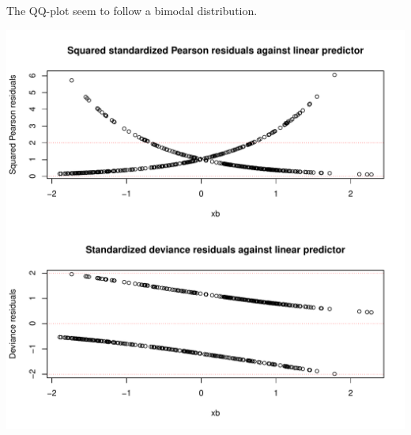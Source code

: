 \documentclass[a4paper]{article}
\begin{document}
The QQ-plot seem to follow a bimodal distribution.

\includegraphics{Project_2_files/figure-latex/unnamed-chunk-11-1.pdf}
\end{document}
